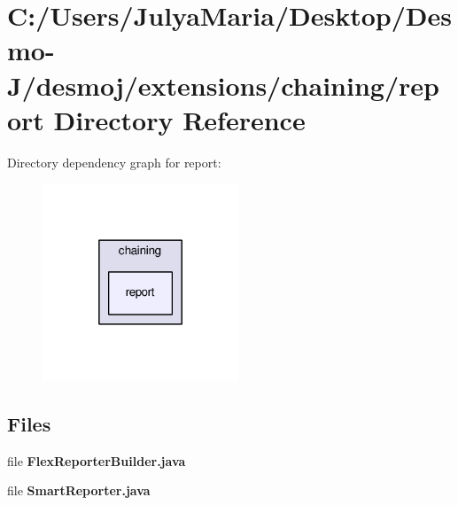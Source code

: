 \section{C\-:/\-Users/\-Julya\-Maria/\-Desktop/\-Desmo-\/\-J/desmoj/extensions/chaining/report Directory Reference}
\label{dir_b26a36fe50e9ccae383befe8eb107494}
Directory dependency graph for report\-:
\nopagebreak
\begin{figure}[H]
\begin{center}
\leavevmode
\includegraphics[width=166pt]{dir_b26a36fe50e9ccae383befe8eb107494_dep}
\end{center}
\end{figure}
\subsection*{Files}
\begin{DoxyCompactItemize}
\item 
file {\bfseries Flex\-Reporter\-Builder.\-java}
\item 
file {\bfseries Smart\-Reporter.\-java}
\end{DoxyCompactItemize}
